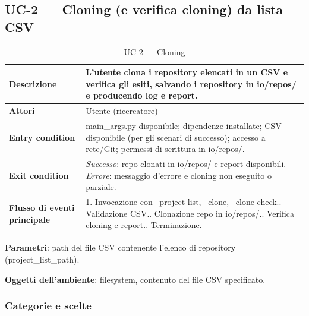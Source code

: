 \documentclass[11pt,a4paper]{article}
\makeatletter
\newif\ifmark@prevlower
\def\mark@casebreak#1{%
  \ifcat\noexpand#1\relax
    \mark@prevlowerfalse
  \else
    \ifnum`#1=\uccode`#1\relax
      \ifmark@prevlower\allowbreak\fi
      \mark@prevlowerfalse
    \else
      \ifnum`#1=\lccode`#1\relax
        \mark@prevlowertrue
      \else
        \mark@prevlowerfalse
      \fi
    \fi
  \fi}
\def\mark@brk#1{%
  \ifx#1\mark@stop
    \let\mark@next\relax
  \else
    \mark@casebreak{#1}%
    #1%
    \ifx#1.\allowbreak\else
      \ifx#1\_\allowbreak\else
        \ifx#1/\allowbreak\else
          \ifx#1(\allowbreak\fi
        \fi
      \fi
    \fi
    \let\mark@next\mark@brk
  \fi
  \mark@next}
\def\mark@stop{\mark@stop}
\DeclareRobustCommand{\mark@code}[1]{%
  \ifmmode
    \text{\ttfamily\small\mark@prevlowerfalse\mark@brk#1\mark@stop}%
  \else
    {\ttfamily\small\mark@prevlowerfalse\mark@brk#1\mark@stop}%
  \fi}
\DeclareRobustCommand{\pkgpath}[1]{\mark@code{#1}}
\DeclareRobustCommand{\file}[1]{\mark@code{#1}}
\DeclareRobustCommand{\flag}[1]{\mark@code{#1}}
\def\mark@code#1{#1}%
\def\pkgpath#1{#1}%
\def\file#1{#1}%
\def\flag#1{#1}%
\newcommand{\thead}[1]{\textbf{#1}}
\makeatother
\begin{document}
\subsection{UC-2 --- Cloning (e verifica cloning) da lista CSV}
\label{sec:uc2}

\begin{table}[H]
  \centering\small
  \caption{UC-2 --- Cloning}
  \label{tab:uc2}
  \begin{tabularx}{\linewidth}{@{}L{3.1cm} Y@{}}
    \toprule
    \thead{Descrizione} & L'utente clona i repository elencati in un CSV e
      verifica gli esiti, salvando i repository in \pkgpath{io/repos/} e
      producendo log e report.\\
    \midrule
    \thead{Attori} & Utente (ricercatore)\\
    \midrule
    \thead{Entry condition} & \file{main\_args.py} disponibile; dipendenze
      installate; CSV disponibile (per gli scenari di successo); accesso a
      rete/Git; permessi di scrittura in \pkgpath{io/repos/}.\\
    \midrule
    \thead{Exit condition} &
      \emph{Successo}: repo clonati in \pkgpath{io/repos/} e report
      disponibili.\newline
      \emph{Errore}: messaggio d'errore e cloning non eseguito o parziale.\\
    \midrule
    \thead{Flusso di eventi principale} &
      1. Invocazione con \flag{--project-list}, \flag{--clone},
         \flag{--clone-check}.. Validazione CSV.. Clonazione repo in \pkgpath{io/repos/}.. Verifica cloning e report.. Terminazione.\\
    \bottomrule
  \end{tabularx}
\end{table}

\textbf{Parametri}: path del file CSV contenente l'elenco di repository
(\flag{project\_list\_path}).

\textbf{Oggetti dell'ambiente}: filesystem, contenuto del file CSV specificato.

\subsubsection{Categorie e scelte}
\end{document}
